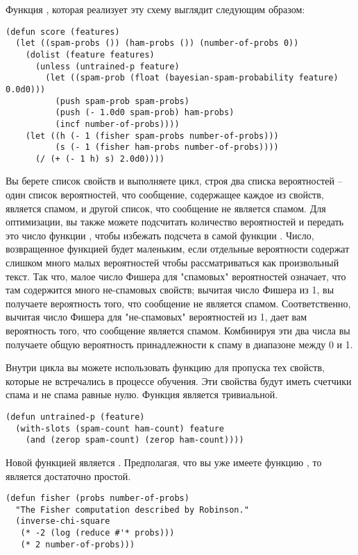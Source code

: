 Функция , которая реализует эту схему выглядит следующим образом:

\begin{lstlisting}
(defun score (features)
  (let ((spam-probs ()) (ham-probs ()) (number-of-probs 0))
    (dolist (feature features)
      (unless (untrained-p feature)
        (let ((spam-prob (float (bayesian-spam-probability feature) 0.0d0)))
          (push spam-prob spam-probs)
          (push (- 1.0d0 spam-prob) ham-probs)
          (incf number-of-probs))))
    (let ((h (- 1 (fisher spam-probs number-of-probs)))
          (s (- 1 (fisher ham-probs number-of-probs))))
      (/ (+ (- 1 h) s) 2.0d0))))
\end{lstlisting}

Вы берете список свойств и выполняете цикл, строя два списка вероятностей -- один список
вероятностей, что сообщение, содержащее каждое из свойств, является спамом, и другой
список, что сообщение не является спамом.  Для оптимизации, вы также можете подсчитать
количество вероятностей и передать это число функции , чтобы избежать
подсчета в самой функции .  Число, возвращенное функцией  будет
маленьким, если отдельные вероятности содержат слишком много малых вероятностей чтобы
рассматриваться как произвольный текст.  Так что, малое число Фишера для "спамовых"
вероятностей означает, что там содержится много не-спамовых свойств; вычитая число Фишера
из 1, вы получаете вероятность того, что сообщение не является спамом.  Соответственно,
вычитая число Фишера для "не-спамовых" вероятностей из 1, дает вам вероятность того, что
сообщение является спамом.  Комбинируя эти два числа вы получаете общую вероятность
принадлежности к спаму в диапазоне между 0 и 1.

Внутри цикла вы можете использовать функцию  для пропуска тех свойств,
которые не встречались в процессе обучения.  Эти свойства будут иметь счетчики спама и не
спама равные нулю.  Функция  является тривиальной.

\begin{lstlisting}
(defun untrained-p (feature)
  (with-slots (spam-count ham-count) feature
    (and (zerop spam-count) (zerop ham-count))))
\end{lstlisting}

Новой функцией является .  Предполагая, что вы уже имеете функцию
, то  является достаточно простой.

\begin{lstlisting}
(defun fisher (probs number-of-probs)
  "The Fisher computation described by Robinson."
  (inverse-chi-square 
   (* -2 (log (reduce #'* probs)))
   (* 2 number-of-probs)))
\end{lstlisting}

